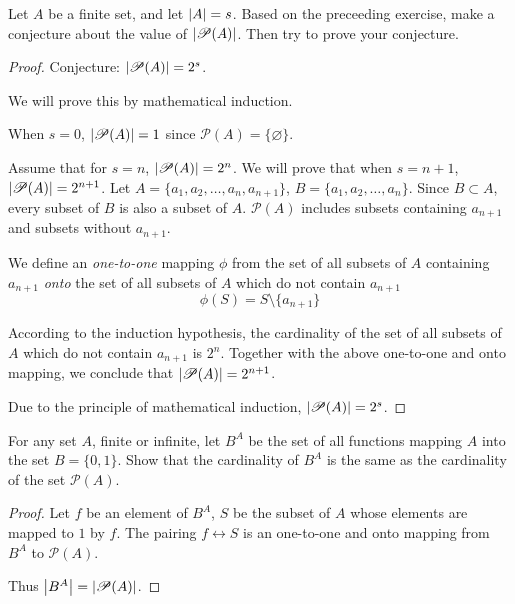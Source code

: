 \newpage
\begin{exercise}
    Let $A$ be a finite set, and let $\left\vert{A}\right\vert = s$. Based on the preceeding exercise, make a conjecture about the value of $\left\vert{\mathscr{P}(A)}\right\vert$. Then try to prove your conjecture.
\end{exercise}

\begin{proof}
    Conjecture: $\left\vert{\mathscr{P}(A)}\right\vert = {2}^{s}$.

    We will prove this by mathematical induction.

    When $s = 0$, $\left\vert{\mathscr{P}(A)}\right\vert = 1$ since $\mathscr{P}(A) = \{ \varnothing \}$.

    Assume that for $s = n$, $\left\vert{\mathscr{P}(A)}\right\vert = {2}^{n}$. We will prove that when $s = n+1$, $\left\vert{\mathscr{P}(A)}\right\vert = {2}^{n+1}$. Let $A = \{ a_{1}, a_{2}, \ldots, a_{n}, a_{n+1} \}$, $B = \{ a_{1}, a_{2}, \ldots, a_{n} \}$. Since $B\subset A$, every subset of $B$ is also a subset of $A$. $\mathscr{P}(A)$ includes subsets containing $a_{n+1}$ and subsets without $a_{n+1}$.

    We define an \textit{one-to-one} mapping $\phi$ from the set of all subsets of $A$ containing $a_{n+1}$ \textit{onto} the set of all subsets of $A$ which do not contain $a_{n+1}$
    \[
        \phi(S) = S\setminus \{ a_{n+1} \}
    \]

    According to the induction hypothesis, the cardinality of the set of all subsets of $A$ which do not contain $a_{n+1}$ is ${2}^{n}$. Together with the above one-to-one and onto mapping, we conclude that $\left\vert{\mathscr{P}(A)}\right\vert = {2}^{n+1}$.

    Due to the principle of mathematical induction, $\left\vert{\mathscr{P}(A)}\right\vert = {2}^{s}$.
\end{proof}

\newpage
\begin{exercise}
    For any set $A$, finite or infinite, let $B^{A}$ be the set of all functions mapping $A$ into the set $B = \{ 0, 1 \}$. Show that the cardinality of $B^{A}$ is the same as the cardinality of the set $\mathscr{P}(A)$.
\end{exercise}

\begin{proof}
    Let $f$ be an element of $B^{A}$, $S$ be the subset of $A$ whose elements are mapped to $1$ by $f$. The pairing $f\leftrightarrow S$ is an one-to-one and onto mapping from $B^{A}$ to $\mathscr{P}(A)$.

    Thus $\left\vert{B^{A}}\right\vert = \left\vert{\mathscr{P}(A)}\right\vert$.
\end{proof}

